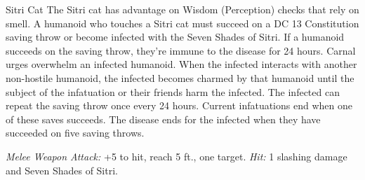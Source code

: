 \documentclass[10pt,a4paper,twoside,twocolumn,openany,bg=print,nodeprecatedcode]{dndbook}
\begin{document}
\begin{DndMonster}[float*=t]{Sitri Cat}
\DndMonsterBasics[
armor-class = {13},
hit-points = {\DndDice{2d4}},
speed = {40 ft., 30 ft. (key)}
]
\DndMonsterAbilityScores[
 str = 3,
 dex = 16,
 con = 10,
 int = 3,
 wis = 12,
 cha = 7
]
\DndMonsterDetails[
skills = {Perception +3, Stealth +5},
challenge = 0,
]
The Sitri cat has advantage on Wisdom (Perception) checks that rely on smell.
A humanoid who touches a Sitri cat must succeed on a DC 13 Constitution saving throw or become infected with the Seven Shades of Sitri. If a humanoid succeeds on the saving throw, they're immune to the disease for 24 hours. Carnal urges overwhelm an infected humanoid. When the infected interacts with another non-hostile humanoid, the infected becomes charmed by that humanoid until the subject of the infatuation or their friends harm the infected. The infected can repeat the saving throw once every 24 hours. Current infatuations end when one of these saves succeeds. The disease ends for the infected when they have succeeded on five saving throws.
\par
{}
\textsl{Melee Weapon Attack:} +5 to hit, reach 5 ft., one target. \textsl{Hit:} 1 slashing damage and Seven Shades of Sitri.
\end{DndMonster}
\end{document}
